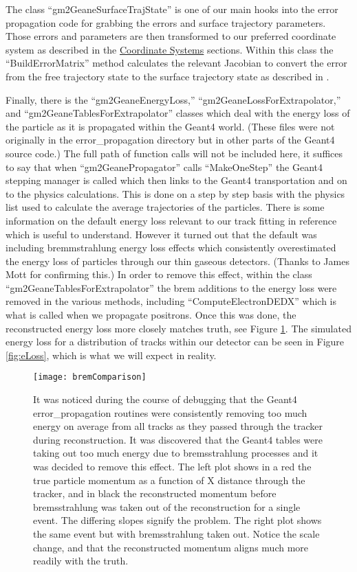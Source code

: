 	The class ``gm2GeaneSurfaceTrajState'' is one of our main hooks into the error propagation code for grabbing the errors and surface trajectory parameters. Those errors and parameters are then transformed to our preferred coordinate system as described in the \hyperref[sec:Coord]{Coordinate Systems} sections. Within this class the ``BuildErrorMatrix'' method calculates the relevant Jacobian to convert the error from the free trajectory state to the surface trajectory state as described in \cite{jacob}.

	Finally, there is the ``gm2GeaneEnergyLoss,'' ``gm2GeaneLossForExtrapolator,'' and ``gm2GeaneTablesForExtrapolator'' classes which deal with the energy loss of the particle as it is propagated within the Geant4 world. (These files were not originally in the error\_propagation directory but in other parts of the Geant4 source code.) The full path of function calls will not be included here, it suffices to say that when ``gm2GeanePropagator'' calls ``MakeOneStep'' the Geant4 stepping manager is called which then links to the Geant4 transportation and on to the physics calculations. This is done on a step by step basis with the physics list used to calculate the average trajectories of the particles. There is some information on the default energy loss relevant to our track fitting in reference \cite{energyloss} which is useful to understand. However it turned out that the default was including bremmstrahlung energy loss effects which consistently overestimated the energy loss of particles through our thin gaseous detectors. (Thanks to James Mott for confirming this.) In order to remove this effect, within the class ``gm2GeaneTablesForExtrapolator'' the brem additions to the energy loss were removed in the various methods, including ``ComputeElectronDEDX'' which is what is called when we propagate positrons. Once this was done, the reconstructed energy loss more closely matches truth, see Figure \ref{fig:bremComparison}. The simulated energy loss for a distribution of tracks within our detector can be seen in Figure \ref{fig:eLoss}, which is what we will expect in reality.

\begin{figure}[]
\caption{It was noticed during the course of debugging that the Geant4 error\_propagation routines were consistently removing too much energy on average from all tracks as they passed through the tracker during reconstruction. It was discovered that the Geant4 tables were taking out too much energy due to bremsstrahlung processes and it was decided to remove this effect. The left plot shows in a red the true particle momentum as a function of X distance through the tracker, and in black the reconstructed momentum before bremsstrahlung was taken out of the reconstruction for a single event. The differing slopes signify the problem. The right plot shows the same event but with bremsstrahlung taken out. Notice the scale change, and that the reconstructed momentum aligns much more readily with the truth.}
\centering
\texttt{[image: bremComparison]}
\label{fig:bremComparison}
\end{figure}


